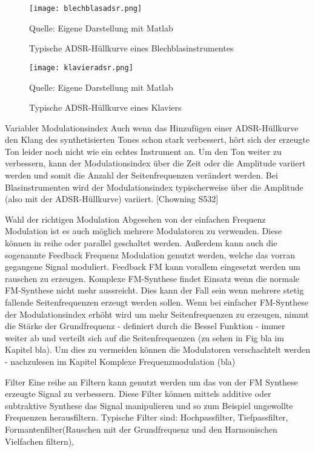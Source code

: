 \begin{figure} [ht]
\centering
  \texttt{[image: blechblasadsr.png]}
\caption{Typische ADSR-Hüllkurve eines Blechblasinstrumentes}
\label{fig:blechblasadsr}
Quelle: Eigene Darstellung mit Matlab
\end{figure}


\begin{figure} [ht]
\centering
  \texttt{[image: klavieradsr.png]}
\caption{Typische ADSR-Hüllkurve eines Klaviers}
\label{fig:klavieradsr}
Quelle: Eigene Darstellung mit Matlab
\end{figure}


Variabler Modulationsindex
Auch wenn das Hinzufügen einer ADSR-Hüllkurve den Klang des synthetisierten Tones schon stark verbessert, hört sich der erzeugte Ton leider noch nicht wie ein echtes Instrument an. Um den Ton weiter zu verbessern, kann der Modulationsindex über die Zeit oder die Amplitude variiert werden und somit die Anzahl der Seitenfrequenzen verändert werden. Bei Blasinstrumenten wird der Modulationsindex typischerweise über die Amplitude (also mit der ADSR-Hüllkurve) variiert. [Chowning S532]

Wahl der richtigen Modulation
Abgesehen von der einfachen Frequenz Modulation ist es auch möglich mehrere Modulatoren zu verwenden. Diese können in reihe oder parallel geschaltet werden. Außerdem kann auch die sogenannte Feedback Frequenz Modulation genutzt werden, welche das vorran gegangene Signal moduliert. Feedback FM kann vorallem eingesetzt werden um rauschen zu erzeugen. Komplexe FM-Synthese findet Einsatz wenn die normale FM-Synthese nicht mehr aussreicht. Dies kann der Fall sein wenn mehrere stetig fallende Seitenfrequenzen erzeugt werden sollen. Wenn bei einfacher FM-Synthese der Modulationsindex erhöht wird um mehr Seitenfrequenzen zu erzeugen, nimmt die Stärke der Grundfrequenz - definiert durch die Bessel Funktion - immer weiter ab und verteilt sich auf die Seitenfrequenzen  (zu sehen in Fig bla im Kapitel bla). Um dies zu vermeiden können die Modulatoren verschachtelt werden - nachzulesen im Kapitel Komplexe Frequenzmodulation (bla)

Filter
Eine reihe an Filtern kann genutzt werden um das von der FM Synthese erzeugte Signal zu verbessern. Diese Filter können mittels additive oder subtraktive Synthese das Signal manipulieren und so zum Beispiel ungewollte Frequenzen herausfiltern. Typische Filter sind: Hochpassfilter, Tiefpassfilter, Formantenfilter(Rauschen mit der Grundfrequenz und den Harmonischen Vielfachen filtern), 

